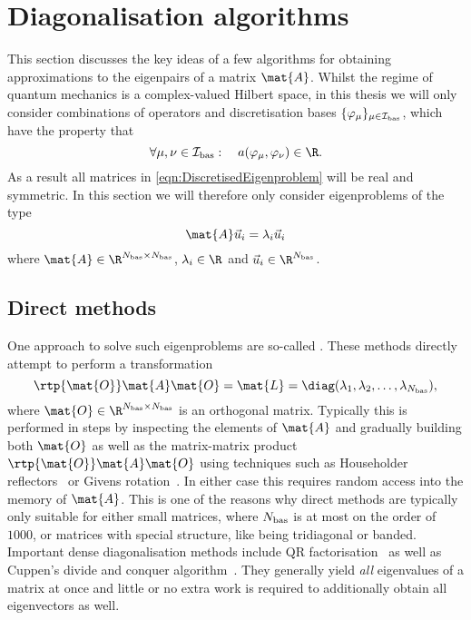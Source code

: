\section{Diagonalisation algorithms}
\label{sec:DiagAlgos}

This section discusses the key ideas of a few algorithms for obtaining
approximations to the eigenpairs of a matrix $\mat{A}$.
Whilst the regime of quantum mechanics is a complex-valued Hilbert space,
in this thesis
we will only consider combinations of operators and discretisation bases
$\{\varphi_\mu\}_{\mu \in \mathcal{I}_\text{bas}}$,
which have the property that
\[ \forall \mu, \nu \in \Ibas: \quad a(\varphi_\mu, \varphi_\nu) \in \R. \]
As a result all matrices in \eqref{eqn:DiscretisedEigenproblem} will be real and symmetric.
In this section we will therefore only consider eigenproblems of the type
\[ \mat{A} \vec{u}_i = \lambda_i \vec{u}_i \]
where $\mat{A} \in \R^{\Nbas \times \Nbas}$,
$\lambda_i \in \R$ and $\vec{u}_i \in \R^{\Nbas}$.

\subsection{Direct methods}
One approach to solve such eigenproblems are
so-called .
These methods directly attempt to perform a transformation
\[ \rtp{\mat{O}} \mat{A} \mat{O} = \mat{L} = \diag(\lambda_1, \lambda_2, \ldots, \lambda_{\Nbas}), \]
where $\mat{O} \in \R^{\Nbas\times\Nbas}$ is an orthogonal matrix.
Typically this is performed in steps by inspecting the elements of $\mat{A}$
and gradually building both $\mat{O}$ as well as the matrix-matrix product
$\rtp{\mat{O}} \mat{A} \mat{O}$
using techniques such as Householder reflectors~\cite{Arbenz2010}
or Givens rotation~\cite{Arbenz2010}.
In either case this requires random access into the memory of $\mat{A}$.
This is one of the reasons why
direct methods are typically only suitable for either small matrices,
where $N_\text{bas}$ is at most on the order of $1000$,
or matrices with special structure,
like being tridiagonal or banded.
Important dense diagonalisation methods include
QR factorisation~\cite{Arbenz2010,Saad2011}
as well as Cuppen's divide and conquer algorithm~\cite{Arbenz2010,Saad2011}.
They generally yield \emph{all} eigenvalues of a matrix at once
and little or no
extra work is required to additionally obtain all eigenvectors as well.

